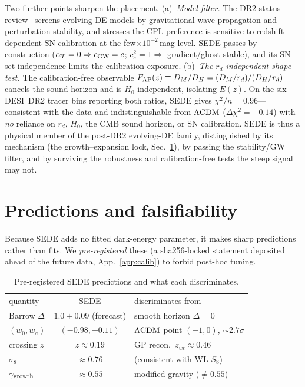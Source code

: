 Two further points sharpen the placement. (a)~\emph{Model filter.} The DR2 status
review~\cite{Turyshev:2026ewm} screens evolving-DE models by gravitational-wave propagation and
perturbation stability, and stresses the CPL preference is sensitive to redshift-dependent SN
calibration at the few$\times10^{-2}$\,mag level. SEDE passes by construction ($\alpha_T=0\Rightarrow
c_{\rm GW}=c$; $c_s^2=1\Rightarrow$ gradient/ghost-stable), and its SN-set independence limits the
calibration exposure. (b)~\emph{The $r_d$-independent shape test.} The calibration-free observable
$F_{\rm AP}(z)\equiv D_M/D_H=(D_M/r_d)/(D_H/r_d)$ cancels the sound horizon and is $H_0$-independent,
isolating $E(z)$. On the six DESI~DR2 tracer bins reporting both ratios, SEDE gives
$\chi^2/n=0.96$---consistent with the data and indistinguishable from $\Lambda\mathrm{CDM}$ ($\Delta\chi^2=-0.14$)
with \emph{no} reliance on $r_d$, $H_0$, the CMB sound horizon, or SN calibration. SEDE is thus a
physical member of the post-DR2 evolving-DE family, distinguished by its mechanism (the
growth--expansion lock, Sec.~\ref{sec:pred}), by passing the stability/GW filter, and by surviving the
robustness and calibration-free tests the steep signal may not.
\section{Predictions and falsifiability}\label{sec:pred}
Because SEDE adds no fitted dark-energy parameter, it makes sharp predictions rather than fits. We
\emph{pre-registered} these (a sha256-locked statement deposited ahead of the future data,
App.~\ref{app:calib}) to forbid post-hoc tuning.

\begin{table}[t]
\caption{Pre-registered SEDE predictions and what each discriminates.}\label{tab:pred}
\begin{ruledtabular}
\begin{tabular}{lcl}
quantity & SEDE & discriminates from \\ \colrule
Barrow $\Delta$ & $1.0\pm0.09$ (forecast) & smooth horizon $\Delta=0$ \\
$(w_0,w_a)$ & $(-0.98,-0.11)$ & $\Lambda\mathrm{CDM}$ point $(-1,0)$, $\sim2.7\sigma$ \\
crossing $z$ & $z\approx0.19$ & GP recon.\ $z_{wt}\approx0.46$ \\
$\sigma_8$ & $\approx0.76$ & (consistent with WL $S_8$) \\
$\gamma_{\rm growth}$ & $\approx0.55$ & modified gravity ($\neq0.55$) \\
\end{tabular}
\end{ruledtabular}
\end{table}

